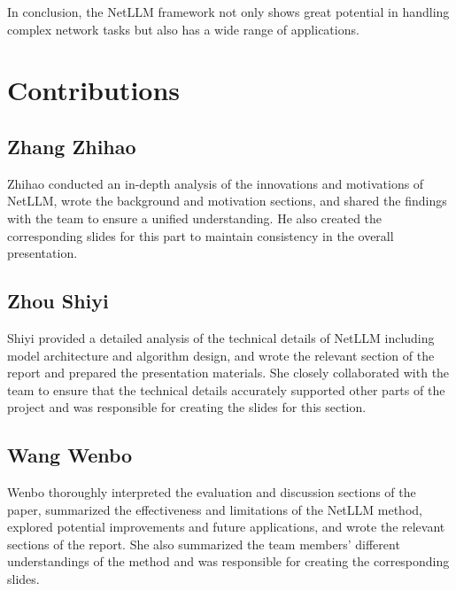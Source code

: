 \documentclass[twocolumn]{article}
\begin{document}
In conclusion, the NetLLM framework not only shows great potential in handling complex network tasks but also has a wide range of applications.

\section{Contributions}

\subsection{Zhang Zhihao}
Zhihao conducted an in-depth analysis of the innovations and motivations of NetLLM, wrote the background and motivation sections, and shared the findings with the team to ensure a unified understanding. He also created the corresponding slides for this part to maintain consistency in the overall presentation.

\subsection{Zhou Shiyi}
Shiyi provided a detailed analysis of the technical details of NetLLM including model architecture and algorithm design, and wrote the relevant section of the report and prepared the presentation materials. She closely collaborated with the team to ensure that the technical details accurately supported other parts of the project and was responsible for creating the slides for this section.

\subsection{Wang Wenbo}
Wenbo thoroughly interpreted the evaluation and discussion sections of the paper, summarized the effectiveness and limitations of the NetLLM method, explored potential improvements and future applications, and wrote the relevant sections of the report. She also summarized the team members' different understandings of the method and was responsible for creating the corresponding slides.
\end{document}

